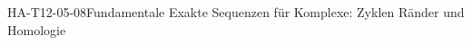 
\begin{EXA}{HA-T12-05-08}{Fundamentale Exakte Sequenzen für Komplexe: Zyklen Ränder und Homologie}
\end{EXA}
